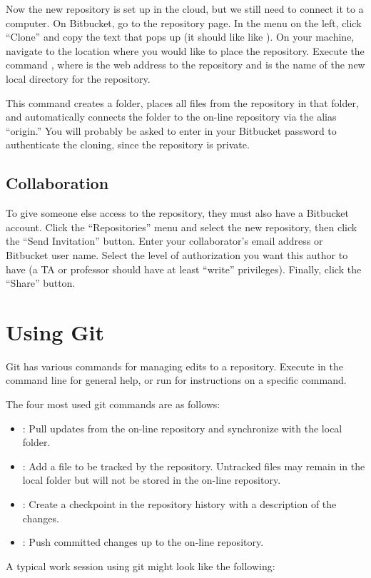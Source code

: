 Now the new repository is set up in the cloud, but we still need to connect it to a computer.
On Bitbucket, go to the repository page.
In the menu on the left, click ``Clone'' and copy the text that pops up (it should like like ).
On your machine, navigate to the location where you would like to place the repository.
Execute the command , where  is the web address to the repository and  is the name of the new local directory for the repository.

This command creates a folder, places all files from the repository in that folder, and automatically connects the folder to the on-line repository via the alias ``origin.''
You will probably be asked to enter in your Bitbucket password to authenticate the cloning, since the repository is private.

\subsection*{Collaboration} %

To give someone else access to the repository, they must also have a Bitbucket account.
Click the ``Repositories'' menu and select the new repository, then click the ``Send Invitation'' button.
Enter your collaborator's email address or Bitbucket user name.
Select the level of authorization you want this author to have (a TA or professor should have at least ``write'' privileges).
Finally, click the ``Share'' button.

\section*{Using Git} %

Git has various commands for managing edits to a repository.
Execute  in the command line for general help, or run  for instructions on a specific command.

The four most used git commands are as follows:
\begin{itemize}
\item {}: Pull updates from the on-line repository and synchronize with the local folder.
\item {}: Add a file to be tracked by the repository. Untracked files may remain in the local folder but will not be stored in the on-line repository.
\item {}: Create a checkpoint in the repository history with a description of the changes.
\item {}: Push committed changes up to the on-line repository.
\end{itemize}
A typical work session using git might look like the following:

